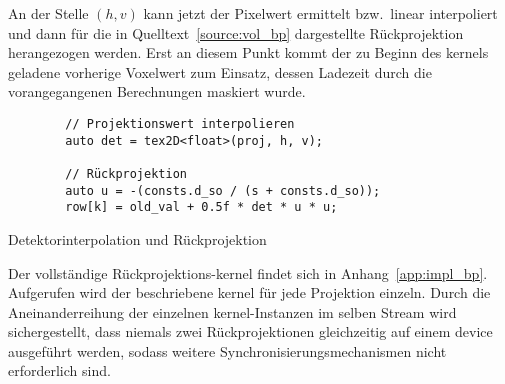 An der Stelle $(h, v)$ kann jetzt der Pixelwert ermittelt bzw.\ linear interpoliert und dann für die in
Quelltext~\ref{source:vol_bp} dargestellte Rückprojektion herangezogen werden. Erst an diesem Punkt kommt der zu Beginn
des \gls{kernel}s geladene vorherige Voxelwert zum Einsatz, dessen Ladezeit durch die vorangegangenen Berechnungen
maskiert wurde.

\begin{code}
\begin{verbatim}
        // Projektionswert interpolieren
        auto det = tex2D<float>(proj, h, v);

        // Rückprojektion
        auto u = -(consts.d_so / (s + consts.d_so));
        row[k] = old_val + 0.5f * det * u * u;
\end{verbatim}
\caption{Detektorinterpolation und Rückprojektion}
\label{source:vol_bp}
\end{code}

Der vollständige Rückprojektions-\gls{kernel} findet sich in Anhang~\ref{app:impl_bp}. Aufgerufen wird der beschriebene
\gls{kernel} für jede Projektion einzeln. Durch die Aneinanderreihung der einzelnen \gls{kernel}-Instanzen im selben
Stream wird sichergestellt, dass niemals zwei Rückprojektionen gleichzeitig auf einem \gls{device} ausgeführt werden,
sodass weitere Synchronisierungsmechanismen nicht erforderlich sind.
